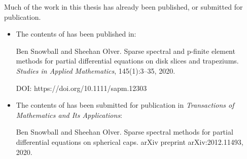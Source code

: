 
\cleardoublepage
{}

\begin{foreword}

Much of the work in this thesis has already been published, or submitted for publication.

\begin{itemize}

\item The contents of  has been published in:

Ben Snowball and Sheehan Olver. Sparse spectral and p-finite element methods for partial differential equations on disk slices and trapeziums. \textit{Studies in Applied Mathematics}, 145(1):3--35, 2020. 

DOI: https://doi.org/10.1111/sapm.12303

\item The contents of  has been submitted for publication in \textit{Transactions of Mathematics and Its Applications}:

Ben Snowball and Sheehan Olver. Sparse spectral methods for partial differential equations on spherical caps. arXiv preprint arXiv:2012.11493, 2020.

\end{itemize}

\end{foreword}
